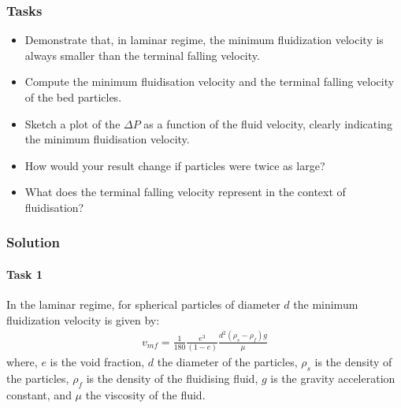 \documentclass[letterpaper,10pt,english]{jupyterBook}
\begin{document}
\subsubsection{Tasks}
\label{\detokenize{Exercise_W11_2021:tasks}}\begin{itemize}
\item {} 
\sphinxAtStartPar
Demonstrate that, in laminar regime, the minimum fluidization velocity is always smaller than the terminal falling velocity.

\item {} 
\sphinxAtStartPar
Compute the minimum fluidisation velocity and the terminal falling velocity of the bed particles.

\item {} 
\sphinxAtStartPar
Sketch a plot of the \(\Delta{P}\) as a function of the fluid velocity, clearly indicating the minimum fluidisation velocity.

\item {} 
\sphinxAtStartPar
How would your result change if particles were twice as large?

\item {} 
\sphinxAtStartPar
What does the terminal falling velocity represent in the context of fluidisation?

\end{itemize}


\subsubsection{Solution}
\label{\detokenize{Exercise_W11_2021:solution}}

\paragraph{Task 1}
\label{\detokenize{Exercise_W11_2021:task-1}}
\sphinxAtStartPar
In the laminar regime, for spherical particles of diameter \(d\) the minimum fluidization velocity is given by:
\begin{equation*}
\begin{split}
v_{mf}=\frac{1}{180}\frac{e^3}{(1-e)}\frac{d^2(\rho_s-\rho_f)g}{\mu}
\end{split}
\end{equation*}
\sphinxAtStartPar
where, \(e\) is the void fraction, \(d\) the diameter of the particles, \(\rho_s\) is the density of the particles,  \(\rho_f\) is the density of the fluidising fluid, \(g\) is the gravity acceleration constant, and \(\mu\) the viscosity of the fluid.
\end{document}
